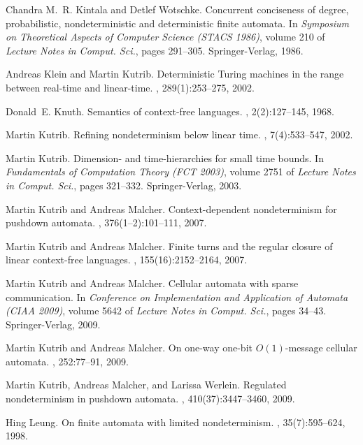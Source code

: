 \documentclass[copyright]{eptcs}
\begin{document}
\begin{thebibliography}{10}
Chandra M.~R. Kintala and Detlef Wotschke.
\newblock Concurrent conciseness of degree, probabilistic, nondeterministic and
  deterministic finite automata.
\newblock In {\em Symposium on Theoretical Aspects of Computer Science ({STACS}
  1986)}, volume 210 of {\em Lecture Notes in Comput. Sci.}, pages 291--305.
  Springer-Verlag, 1986.

Andreas Klein and Martin Kutrib.
\newblock Deterministic {T}uring machines in the range between real-time and
  linear-time.
, 289(1):253--275, 2002.

Donald~E. Knuth.
\newblock Semantics of context-free languages.
, 2(2):127--145, 1968.

Martin Kutrib.
\newblock Refining nondeterminism below linear time.
, 7(4):533--547, 2002.

Martin Kutrib.
\newblock Dimension- and time-hierarchies for small time bounds.
\newblock In {\em Fundamentals of Computation Theory ({FCT} 2003)}, volume 2751
  of {\em Lecture Notes in Comput. Sci.}, pages 321--332. Springer-Verlag,
  2003.

Martin Kutrib and Andreas Malcher.
\newblock Context-dependent nondeterminism for pushdown automata.
, 376(1--2):101--111, 2007.

Martin Kutrib and Andreas Malcher.
\newblock Finite turns and the regular closure of linear context-free
  languages.
, 155(16):2152--2164, 2007.

Martin Kutrib and Andreas Malcher.
\newblock Cellular automata with sparse communication.
\newblock In {\em Conference on Implementation and Application of Automata
  (CIAA 2009)}, volume 5642 of {\em Lecture Notes in Comput. Sci.}, pages
  34--43. Springer-Verlag, 2009.

Martin Kutrib and Andreas Malcher.
\newblock On one-way one-bit ${O}(1)$-message cellular automata.
, 252:77--91, 2009.

Martin Kutrib, Andreas Malcher, and Larissa Werlein.
\newblock Regulated nondeterminism in pushdown automata.
, 410(37):3447--3460, 2009.

Hing Leung.
\newblock On finite automata with limited nondeterminism.
, 35(7):595--624, 1998.


\end{thebibliography}
\end{document}
